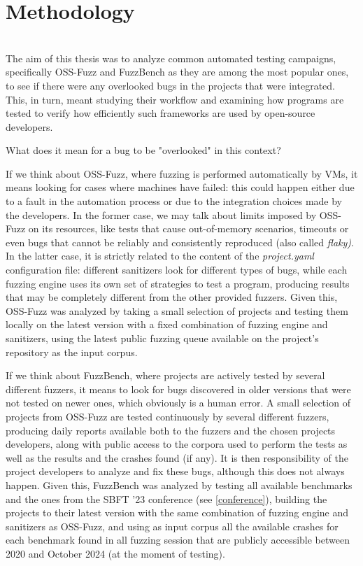 
\chapter{Methodology} \label{chap_3}
\ \\
The aim of this thesis was to analyze common automated testing campaigns, specifically OSS-Fuzz and FuzzBench as they are among the most popular ones, to see if there were any overlooked bugs in the projects that were integrated. This, in turn, meant studying their workflow and examining how programs are tested to verify how efficiently such frameworks are used by open-source developers.

What does it mean for a bug to be "overlooked" in this context?

If we think about OSS-Fuzz, where fuzzing is performed automatically by VMs, it means looking for cases where machines have failed: this could happen either due to a fault in the automation process or due to the integration choices made by the developers. In the former case, we may talk about limits imposed by OSS-Fuzz on its resources, like tests that cause out-of-memory scenarios, timeouts or even bugs that cannot be reliably and consistently reproduced (also called \textit{flaky)}. In the latter case, it is strictly related to the content of the \textit{project.yaml} configuration file: different sanitizers look for different types of bugs, while each fuzzing engine uses its own set of strategies to test a program, producing results that may be completely different from the other provided fuzzers. Given this, OSS-Fuzz was analyzed by taking a small selection of projects and testing them locally on the latest version with a fixed combination of fuzzing engine and sanitizers, using the latest public fuzzing queue available on the project's repository as the input corpus. 

If we think about FuzzBench, where projects are actively tested by several different fuzzers, it means to look for bugs discovered in older versions that were not tested on newer ones, which obviously is a human error. A small selection of projects from OSS-Fuzz are tested continuously by several different fuzzers, producing daily reports available both to the fuzzers and the chosen projects developers, along with public access to the corpora used to perform the tests as well as the results and the crashes found (if any). It is then responsibility of the project developers to analyze and fix these bugs, although this does not always happen. Given this, FuzzBench was analyzed by testing all available benchmarks and the ones from the SBFT '23 conference (see \ref{conference}), building the projects to their latest version with the same combination of fuzzing engine and sanitizers as OSS-Fuzz, and using as input corpus all the available crashes for each benchmark found in all fuzzing session that are publicly accessible between 2020 and October 2024 (at the moment of testing).


